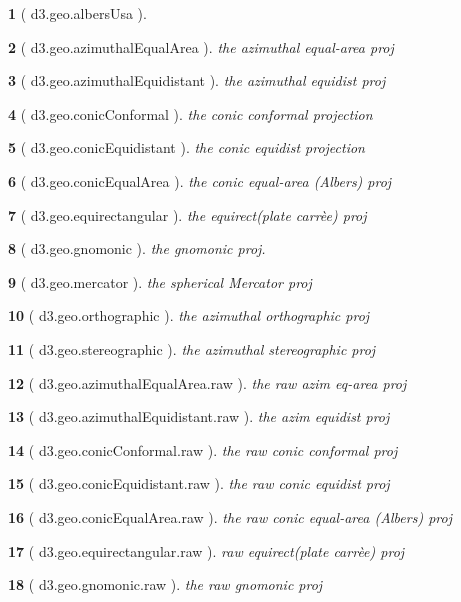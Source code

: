 \documentclass[10pt,landscape,letterpaper]{article}
\newcounter{thm}
\theoremstyle{mytheoremstyle}
\newtheorem*{thm}{}
\begin{document}
\begin{multicols}{3}
\begin{thm} [ d3.geo.albersUsa ]
\end{thm}\begin{thm} [ d3.geo.azimuthalEqualArea ]  the azimuthal equal-area proj
\end{thm}\begin{thm} [ d3.geo.azimuthalEquidistant ]  the azimuthal equidist proj
\end{thm}\begin{thm} [ d3.geo.conicConformal ]  the conic conformal projection
\end{thm}\begin{thm} [ d3.geo.conicEquidistant ]  the conic equidist projection
\end{thm}\begin{thm} [ d3.geo.conicEqualArea ]  the conic equal-area (Albers) proj
\end{thm}\begin{thm} [ d3.geo.equirectangular ]  the equirect(plate carr\`ee) proj
\end{thm}\begin{thm} [ d3.geo.gnomonic ]  the gnomonic proj.
\end{thm}\begin{thm} [ d3.geo.mercator ]  the spherical Mercator proj
\end{thm}\begin{thm} [ d3.geo.orthographic ]  the azimuthal orthographic proj
\end{thm}\begin{thm} [ d3.geo.stereographic ]  the azimuthal stereographic proj
\end{thm}\begin{thm} [ d3.geo.azimuthalEqualArea.raw ]  the raw azim eq-area proj
\end{thm}\begin{thm} [ d3.geo.azimuthalEquidistant.raw ]  the azim equidist proj
\end{thm}\begin{thm} [ d3.geo.conicConformal.raw ]  the raw conic conformal proj
\end{thm}\begin{thm} [ d3.geo.conicEquidistant.raw ]  the raw conic equidist proj
\end{thm}\begin{thm} [ d3.geo.conicEqualArea.raw ]  the raw conic equal-area (Albers) proj
\end{thm}\begin{thm} [ d3.geo.equirectangular.raw ] raw equirect(plate carr\`ee) proj
\end{thm}\begin{thm} [ d3.geo.gnomonic.raw ]  the raw gnomonic proj

\end{thm}
\end{multicols}
\end{document}
